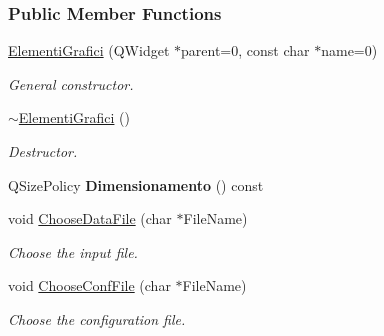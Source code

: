 \subsubsection*{Public Member Functions}
\begin{DoxyCompactItemize}
\item 
\hyperlink{classElementiGrafici_aae49d2145b40fce2fbcee668b2934669}{Elementi\+Grafici} (Q\+Widget $\ast$parent=0, const char $\ast$name=0)\hypertarget{classElementiGrafici_aae49d2145b40fce2fbcee668b2934669}{}\label{classElementiGrafici_aae49d2145b40fce2fbcee668b2934669}

\begin{DoxyCompactList}\small\item\em General constructor. \end{DoxyCompactList}\item 
\hyperlink{classElementiGrafici_ae572bae1d4f4a3c6aa1d40edb62bdaf0}{$\sim$\+Elementi\+Grafici} ()\hypertarget{classElementiGrafici_ae572bae1d4f4a3c6aa1d40edb62bdaf0}{}\label{classElementiGrafici_ae572bae1d4f4a3c6aa1d40edb62bdaf0}

\begin{DoxyCompactList}\small\item\em Destructor. \end{DoxyCompactList}\item 
Q\+Size\+Policy {\bfseries Dimensionamento} () const \hypertarget{classElementiGrafici_ab6fbc22c59252cb6152e25ca454a6595}{}\label{classElementiGrafici_ab6fbc22c59252cb6152e25ca454a6595}

\item 
void \hyperlink{classElementiGrafici_a61a52933f2e84207a3ef7c376ce7df38}{Choose\+Data\+File} (char $\ast$File\+Name)\hypertarget{classElementiGrafici_a61a52933f2e84207a3ef7c376ce7df38}{}\label{classElementiGrafici_a61a52933f2e84207a3ef7c376ce7df38}

\begin{DoxyCompactList}\small\item\em Choose the input file. \end{DoxyCompactList}\item 
void \hyperlink{classElementiGrafici_a942934affd7a22cfa6d0297f89217292}{Choose\+Conf\+File} (char $\ast$File\+Name)\hypertarget{classElementiGrafici_a942934affd7a22cfa6d0297f89217292}{}\label{classElementiGrafici_a942934affd7a22cfa6d0297f89217292}

\begin{DoxyCompactList}\small\item\em Choose the configuration file. \end{DoxyCompactList}\end{DoxyCompactItemize}
